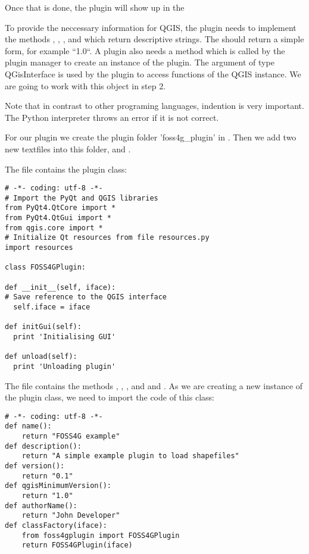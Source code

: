 Once that is done, the plugin will show up in the

To provide the neccessary information for QGIS, the plugin needs to implement
the methods , , ,
 and  which return descriptive strings.
The  should return a simple form, for example ``1.0``. A plugin also needs a method
 which is called by the plugin manager to create
an instance of the plugin. The argument of type QGisInterface is used by the
plugin to access functions of the QGIS instance. We are going to work with
this object in step 2.  

Note that in contrast to other programing languages, indention is very
important. The Python interpreter throws an error if it is not correct.

For our plugin we create the plugin folder 'foss4g\_plugin' in
. Then we add two new textfiles into this
folder,  and .

The file  contains the plugin class:

\begin{verbatim}
# -*- coding: utf-8 -*-
# Import the PyQt and QGIS libraries
from PyQt4.QtCore import *
from PyQt4.QtGui import *
from qgis.core import *
# Initialize Qt resources from file resources.py
import resources

class FOSS4GPlugin:

def __init__(self, iface):
# Save reference to the QGIS interface
  self.iface = iface

def initGui(self):
  print 'Initialising GUI'

def unload(self):
  print 'Unloading plugin'
\end{verbatim}

The file  contains the methods ,
, , 
and  and . As
we are creating a new instance of the plugin class, we need to import the
code of this class:

\begin{verbatim}
# -*- coding: utf-8 -*-
def name():
    return "FOSS4G example"
def description():
    return "A simple example plugin to load shapefiles"
def version():
    return "0.1"
def qgisMinimumVersion():
    return "1.0"
def authorName():
    return "John Developer"
def classFactory(iface):
    from foss4gplugin import FOSS4GPlugin
    return FOSS4GPlugin(iface)
\end{verbatim}


